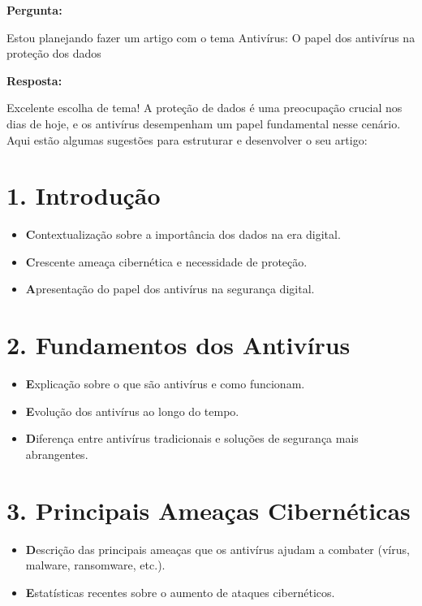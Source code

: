 \documentclass[10pt,conference,twocolumn]{article}
\begin{document}
\textbf{Pergunta:}\newline

Estou planejando fazer um artigo com o tema Antivírus: O papel dos antivírus na proteção dos dados\newline

\textbf{Resposta:}\newline

Excelente escolha de tema! A proteção de dados é uma preocupação crucial nos dias de hoje, e os antivírus desempenham um papel fundamental nesse cenário. Aqui estão algumas sugestões para estruturar e desenvolver o seu artigo:

\section* {1. Introdução}
\begin{itemize}
\item \textbf Contextualização sobre a importância dos dados na era digital.
\item \textbf Crescente ameaça cibernética e necessidade de proteção.
\item \textbf Apresentação do papel dos antivírus na segurança digital.
\end{itemize}

\section* {2. Fundamentos dos Antivírus}
\begin{itemize}
\item \textbf Explicação sobre o que são antivírus e como funcionam.
\item \textbf Evolução dos antivírus ao longo do tempo.
\item \textbf Diferença entre antivírus tradicionais e soluções de segurança mais abrangentes.
\end{itemize}

\section* {3. Principais Ameaças Cibernéticas}
\begin{itemize}
\item \textbf Descrição das principais ameaças que os antivírus ajudam a combater (vírus, malware, ransomware, etc.).
\item \textbf Estatísticas recentes sobre o aumento de ataques cibernéticos.
\end{itemize}
\end{document}
